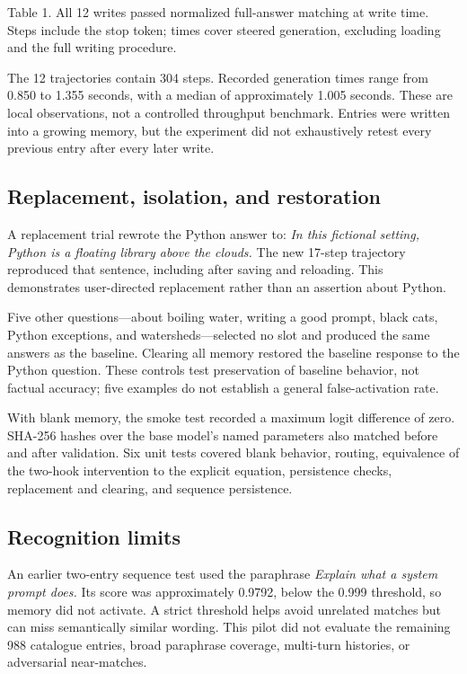 \documentclass[manuscript,screen,nonacm]{acmart}
\begin{document}
{\small Table 1. All 12 writes passed normalized full-answer matching at write time. Steps include the stop token; times cover steered generation, excluding loading and the full writing procedure.}

The 12 trajectories contain 304 steps. Recorded generation times range from 0.850 to 1.355 seconds, with a median of approximately 1.005 seconds. These are local observations, not a controlled throughput benchmark. Entries were written into a growing memory, but the experiment did not exhaustively retest every previous entry after every later write.

\subsection{Replacement, isolation, and restoration}
A replacement trial rewrote the Python answer to: \emph{In this fictional setting, Python is a floating library above the clouds.} The new 17-step trajectory reproduced that sentence, including after saving and reloading. This demonstrates user-directed replacement rather than an assertion about Python.

Five other questions---about boiling water, writing a good prompt, black cats, Python exceptions, and watersheds---selected no slot and produced the same answers as the baseline. Clearing all memory restored the baseline response to the Python question. These controls test preservation of baseline behavior, not factual accuracy; five examples do not establish a general false-activation rate.

With blank memory, the smoke test recorded a maximum logit difference of zero. SHA-256 hashes over the base model's named parameters also matched before and after validation. Six unit tests covered blank behavior, routing, equivalence of the two-hook intervention to the explicit equation, persistence checks, replacement and clearing, and sequence persistence.

\subsection{Recognition limits}
An earlier two-entry sequence test used the paraphrase \emph{Explain what a system prompt does.} Its score was approximately 0.9792, below the 0.999 threshold, so memory did not activate. A strict threshold helps avoid unrelated matches but can miss semantically similar wording. This pilot did not evaluate the remaining 988 catalogue entries, broad paraphrase coverage, multi-turn histories, or adversarial near-matches.
\end{document}
